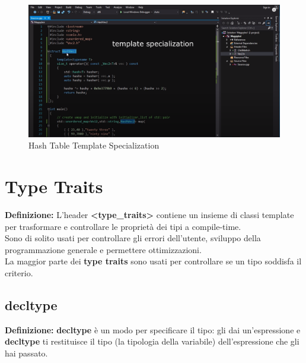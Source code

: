 \begin{figure}[H]
	\centering
	\includegraphics[width=1.2\textwidth, height=1.2\textheight, keepaspectratio]{./imgs/hash_table_template_specialization.png}
	\caption{Hash Table Template Specialization}
	\label{fig:hash_table_template_specialization}
\end{figure}



\newpage

\section{Type Traits}

\textsf{\small \textbf{Definizione: } L'header \textbf{<type\_traits>} contiene un insieme di classi template per trasformare e controllare le proprietà dei tipi a compile-time.} \\

\textsf{\small Sono di solito usati per controllare gli errori dell'utente, sviluppo della programmazione generale e permettere ottimizzazioni.} \\

\textsf{\small La maggior parte dei \textbf{type traits} sono usati per controllare se un tipo soddisfa il criterio.} \\

\subsection{decltype}

\textsf{\small \textbf{Definizione: } \textbf{decltype} è un modo per specificare il  tipo: gli dai un'espressione e \textbf{decltype} ti restituisce il tipo (la tipologia della variabile) dell'espressione che gli hai passato.} \\

